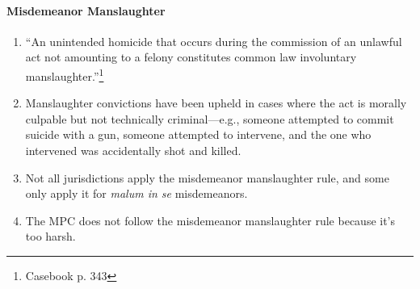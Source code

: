 \paragraph{Misdemeanor Manslaughter}

\begin{enumerate}
    \item ``An unintended homicide that occurs during the commission of an 
    unlawful act not amounting to a felony constitutes common law involuntary 
    manslaughter.''\footnote{Casebook p. 343}
    \item Manslaughter convictions have been upheld in cases where the act is 
    morally culpable but not technically criminal---e.g., someone attempted to 
    commit suicide with a gun, someone attempted to intervene, and the one who 
    intervened was accidentally shot and killed.
    \item Not all jurisdictions apply the misdemeanor manslaughter rule, and 
    some only apply it for \emph{malum in se} misdemeanors.
    \item The MPC does not follow the misdemeanor manslaughter rule because 
    it's too harsh.
\end{enumerate}
